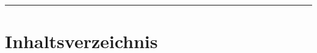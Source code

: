 \maketitle
\hrule
\vspace{5ex}
\section*{Inhaltsverzeichnis}
\toccontents
\pagebreak
\lstlistoflistings